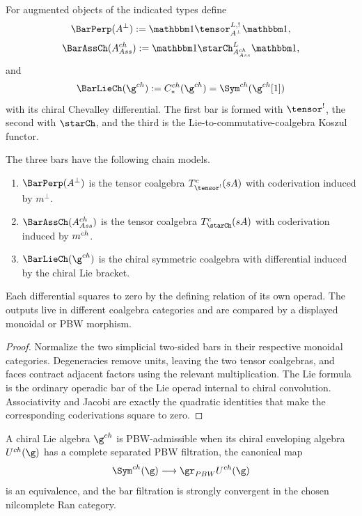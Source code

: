 \begin{definition}
For augmented objects of the indicated types define
\[
 \BarPerp(A^\perp)
   :=\mathbbm1\tensor_{A^\perp}^{\mathbb L,!}\mathbbm1,
\]
\[
 \BarAssCh(A^{\ch}_{\mathsf{Ass}})
   :=\mathbbm1\starCh_{A^{\ch}_{\mathsf{Ass}}}^{\mathbb L}\mathbbm1,
\]
and
\[
 \BarLieCh(\g^{\ch})
   :=C_*^{\ch}(\g^{\ch})
   =\Sym^{\ch}(\g^{\ch}[1])
\]
with its chiral Chevalley differential.  The first bar is formed with $\tensor^!$, the second with $\starCh$, and the third is the Lie-to-commutative-coalgebra Koszul functor.
\end{definition}

\begin{theorem}
The three bars have the following chain models.
\begin{enumerate}
\item $\BarPerp(A^\perp)$ is the tensor coalgebra $T^c_{\tensor^!}(s\bar A)$ with coderivation induced by $m^\perp$.
\item $\BarAssCh(A^{\ch}_{\mathsf{Ass}})$ is the tensor coalgebra $T^c_{\starCh}(s\bar A)$ with coderivation induced by $m^{ch}$.
\item $\BarLieCh(\g^{\ch})$ is the chiral symmetric coalgebra with differential induced by the chiral Lie bracket.
\end{enumerate}
Each differential squares to zero by the defining relation of its own operad.  The outputs live in different coalgebra categories and are compared by a displayed monoidal or PBW morphism.
\end{theorem}
\begin{proof}
Normalize the two simplicial two-sided bars in their respective monoidal categories.  Degeneracies remove units, leaving the two tensor coalgebras, and faces contract adjacent factors using the relevant multiplication.  The Lie formula is the ordinary operadic bar of the Lie operad internal to chiral convolution.  Associativity and Jacobi are exactly the quadratic identities that make the corresponding coderivations square to zero.
\end{proof}

\begin{definition}
A chiral Lie algebra $\g^{\ch}$ is PBW-admissible when its chiral enveloping algebra $U^{\ch}(\g)$ has a complete separated PBW filtration, the canonical map
\[
 \Sym^{\ch}(\g)\longrightarrow\gr_{\mathrm{PBW}}U^{\ch}(\g)
\]
is an equivalence, and the bar filtration is strongly convergent in the chosen nilcomplete Ran category.
\end{definition}


